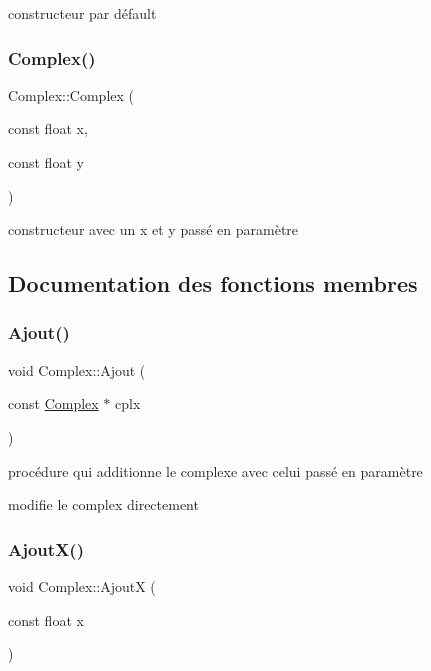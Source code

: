 constructeur par défault 

\mbox{\label{classComplex_a7aecdf154c80482286a9d3d01a805bc0}} 
\subsubsection{\texorpdfstring{Complex()}{Complex()}\hspace{0.1cm}{\footnotesize\ttfamily [2/2]}}
{\footnotesize\ttfamily Complex\+::\+Complex (\begin{DoxyParamCaption}\item[{const float}]{x,  }\item[{const float}]{y }\end{DoxyParamCaption})}



constructeur avec un x et y passé en paramètre 



\subsection{Documentation des fonctions membres}
\mbox{\label{classComplex_a77329ef019354c92b879b6e6ff081ece}} 
\subsubsection{\texorpdfstring{Ajout()}{Ajout()}}
{\footnotesize\ttfamily void Complex\+::\+Ajout (\begin{DoxyParamCaption}\item[{const \hyperlink{classComplex}{Complex} $\ast$}]{cplx }\end{DoxyParamCaption})}



procédure qui additionne le complexe avec celui passé en paramètre 

modifie le complex directement \mbox{\label{classComplex_a46b40fa2a1f237ea0d225d6128b6da50}} 
\subsubsection{\texorpdfstring{Ajout\+X()}{AjoutX()}}
{\footnotesize\ttfamily void Complex\+::\+AjoutX (\begin{DoxyParamCaption}\item[{const float}]{x }\end{DoxyParamCaption})}



